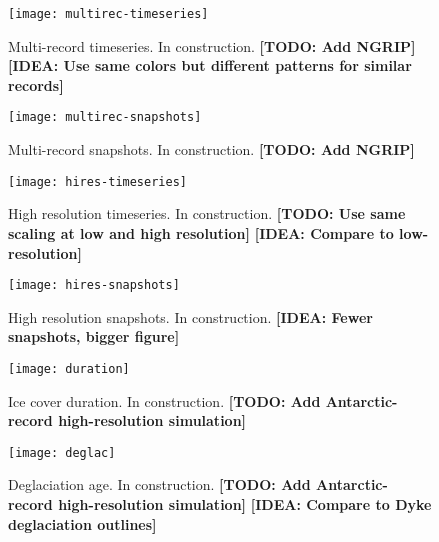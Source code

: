 \documentclass[tc, ms]{copernicus}
\def\idea#1{\textcolor[rgb]{0,0.5,0}{\textbf{[IDEA: #1]}}}
\def\todo#1{\textcolor[rgb]{0.5,0,0}{\textbf{[TODO: #1]}}}
\begin{document}
\begin{figure}
  \texttt{[image: multirec-timeseries]}
  \caption{Multi-record timeseries. In construction.
           \todo{Add NGRIP}
           \idea{Use same colors but different patterns for similar records}}
  \label{fig:multirec-timeseries}
\end{figure}

\begin{figure}
  \texttt{[image: multirec-snapshots]}
  \caption{Multi-record snapshots. In construction.
           \todo{Add NGRIP}}
  \label{fig:multirec-snapshots}
\end{figure}

\begin{figure}
  \texttt{[image: hires-timeseries]}
  \caption{High resolution timeseries. In construction.
           \todo{Use same scaling at low and high resolution}
           \idea{Compare to low-resolution}}
  \label{fig:hires-timeseries}
\end{figure}

\begin{figure}
  \texttt{[image: hires-snapshots]}
  \caption{High resolution snapshots. In construction.
           \idea{Fewer snapshots, bigger figure}}
  \label{fig:hires-snapshots}
\end{figure}

\begin{figure}
  \texttt{[image: duration]}
  \caption{Ice cover duration. In construction.
           \todo{Add Antarctic-record high-resolution simulation}}
  \label{fig:duration}
\end{figure}

\begin{figure}
  \texttt{[image: deglac]}
  \caption{Deglaciation age. In construction.
           \todo{Add Antarctic-record high-resolution simulation}
           \idea{Compare to Dyke deglaciation outlines}}
  \label{fig:deglac}
\end{figure}

\end{document}
